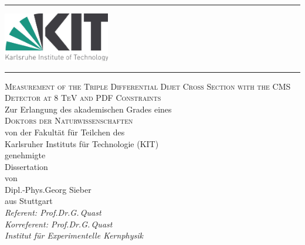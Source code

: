 \begin{titlepage}
    \begin{addmargin}[2cm]{0cm}
        \thispagestyle{empty}
        \begin{center}
            \vspace*{-2cm}
            \vspace{-0.3cm}
            \rule{\linewidth}{0.75pt}
            \vspace{-0.15cm}

            \includegraphics[width=0.35\textwidth]{figures/KIT_logo}

            \vspace{-0.3cm}
            \rule{\linewidth}{0.75pt}

            \vspace{2.8cm}


            \LARGE{\textsc{Measurement of the Triple Differential Dijet Cross Section
                           with the CMS Detector at 8 TeV and PDF Constraints}}\\
            \vspace{3.0cm}
            \large{Zur Erlangung des akademischen Grades eines\\
                \textsc{Doktors der Naturwissenschaften}\\
                von der Fakult\"at f\"ur Teilchen des\\
            Karlsruher Instituts f\"ur Technologie (KIT)\\ genehmigte}\\
            \vspace{0.5 cm}
            \large{Dissertation}\\
            \vspace{0.6 cm}
            \large{von}\\
            \vspace{0.3 cm}
            \large{Dipl.-Phys.\;Georg Sieber\\aus Stuttgart}\\
            \vspace{1.5 cm}
            \large{\textit{Referent: Prof.\;Dr.\;G.\,Quast\\Korreferent: Prof.\;Dr.\;G.\,Quast\\
            Institut f\"ur Experimentelle Kernphysik}}\\
        \end{center}
    \end{addmargin}
\end{titlepage}

\cleardoublepage

